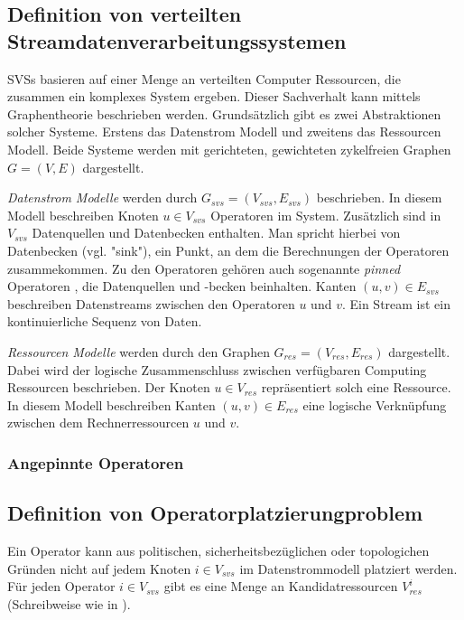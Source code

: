 \documentclass{article}
\begin{document}
\subsection{Definition von verteilten Streamdatenverarbeitungssystemen}  \label{SVS-Definition}  %
SVSs basieren auf einer Menge an verteilten Computer Ressourcen, die zusammen ein komplexes System ergeben. 
Dieser Sachverhalt kann mittels Graphentheorie beschrieben werden. Grundsätzlich gibt es zwei Abstraktionen solcher Systeme. 
Erstens das Datenstrom Modell und zweitens das Ressourcen Modell. 
Beide Systeme werden mit gerichteten, gewichteten zykelfreien Graphen $G = (V,E)$ dargestellt. 

\textit{Datenstrom Modelle} werden durch $G_{svs} = (V_{svs}, E_{svs})$ beschrieben. In diesem Modell beschreiben Knoten $u \in V_{svs}$ Operatoren im System. 
Zusätzlich sind in $V_{svs}$ Datenquellen und Datenbecken enthalten. Man spricht hierbei von Datenbecken (vgl. "sink"), ein Punkt, an dem die Berechnungen der Operatoren zusammekommen. 
Zu den Operatoren gehören auch sogenannte \textit{pinned} Operatoren \cite{efficient-operator-placement}, 
die Datenquellen und -becken beinhalten. Kanten $(u,v) \in E_{svs}$ beschreiben Datenstreams 
zwischen den Operatoren $u$ und $v$.  Ein Stream ist ein kontinuierliche Sequenz von Daten. 

\textit{Ressourcen Modelle} werden durch den Graphen $G_{res} = (V_{res}, E_{res})$ dargestellt. 
Dabei wird der logische Zusammenschluss zwischen verfügbaren Computing Ressourcen beschrieben. Der Knoten $u \in V_{res}$ 
repräsentiert solch eine Ressource. In diesem Modell beschreiben Kanten $(u,v) \in E_{res}$ 
eine logische Verknüpfung zwischen dem Rechnerressourcen $u$ und $v$.

\subsubsection{Angepinnte Operatoren}

\subsection{Definition von Operatorplatzierungproblem} \label{OPP-Definition}
Ein Operator kann aus politischen, sicherheitsbezüglichen oder topologichen Gründen \cite{cardellini-optimal_operatorplc} nicht auf jedem Knoten 
$i \in V_{svs}$ im Datenstrommodell platziert werden. 
Für jeden Operator $i \in V_{svs}$ gibt es eine Menge an Kandidatressourcen $V_{res}^i$ (Schreibweise wie in \cite{efficient-operator-placement}).
\end{document}
